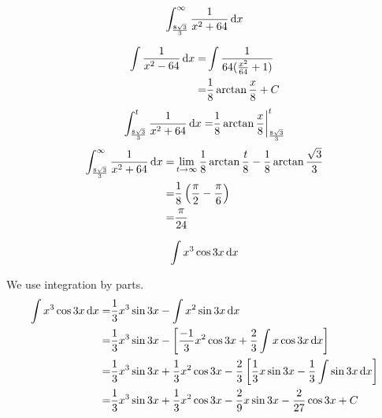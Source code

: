 \begin{ex}
  \[ \int^\infty_{\frac{8\sqrt 3}{3}}\frac{1}{x^2+64}\,\mathrm{d} x \]
  \begin{sol}
    \begin{align*}
      \int \frac{1}{x^2-64}\,\mathrm{d} x
      =& \int \frac{1}{64(\frac{x^2}{64}+1)} \\
      =&\frac{1}{8}\arctan{\frac{x}{8}} + C
    \end{align*}
    \begin{align*}
      \int^t_{\frac{8\sqrt 3}{3}}\frac{1}{x^2+64}\,\mathrm{d} x
      =&\frac{1}{8}\arctan{\frac{x}{8}}\bigg|^t_{\frac{8\sqrt 3}{3}} \\
    \end{align*}
    \begin{align*}
      \int^\infty_{\frac{8\sqrt 3}{3}}\frac{1}{x^2+64}\,\mathrm{d} x
      =& \lim_{t \to \infty} \frac{1}{8}\arctan{\frac{t}{8}}-\frac{1}{8}\arctan{\frac{\sqrt 3}{3}} \\
      =& \frac{1}{8}\left(\frac{\pi}{2}-\frac{\pi}{6}\right) \\
      =& \frac{\pi}{24}
    \end{align*}
  \end{sol}
\end{ex}
\begin{ex}
  \[\int x^3 \cos{3x} \,\mathrm{d} x\]
  \begin{sol}
    We use integration by parts.
    \begin{align*}
      \int x^3 \cos{3x} \,\mathrm{d} x
      =& \frac{1}{3}x^3\sin{3x}-\int x^2 \sin{3x}\,\mathrm{d} x \\
      =& \frac{1}{3}x^3\sin{3x}-\left[
        \frac{-1}{3}x^2\cos{3x}+\frac{2}{3}\int x \cos{3x} \,\mathrm{d} x
        \right] \\
        =& \frac{1}{3}x^3\sin{3x}+\frac{1}{3}x^2\cos{3x}-\frac{2}{3}\left[\frac{1}{3}x\sin{3x}-\frac{1}{3}\int \sin{3x}\,\mathrm{d} x\right] \\
        =&\frac{1}{3}x^3\sin{3x}+\frac{1}{3}x^2\cos{3x}-\frac{2}{9}x\sin{3x}-\frac{2}{27}\cos{3x}+C
    \end{align*}
  \end{sol} \end{ex}



